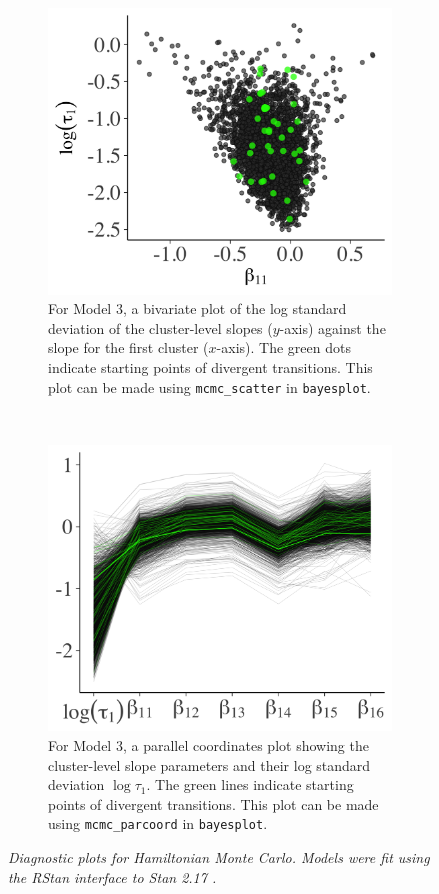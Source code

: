 \documentclass{statsoc}
\newcommand{\bayesplot}{{\tt bayesplot}}
\begin{document}
\begin{figure}
\centering
\begin{subfigure}{0.48\textwidth}
\includegraphics[width=\textwidth]{mcmc_scatter_divs.png}
\caption{For Model 3, a bivariate plot of the log standard deviation of the
cluster-level slopes ($y$-axis) against the slope for the first cluster
($x$-axis). The green dots indicate starting points of divergent transitions.
This plot can be made using {\tt mcmc\_scatter} in \bayesplot. }
\label{fig:mcmc_scatter_divs}
\end{subfigure}
~
\begin{subfigure}{0.48\textwidth}
\includegraphics[width=\textwidth]{mcmc_parcoord_divs.png}
\caption{For Model 3, a parallel coordinates plot showing the cluster-level
slope parameters and their log standard deviation $\log{\tau_1}$. The green
lines indicate starting points of divergent transitions. This plot can be made
using {\tt mcmc\_parcoord} in \bayesplot.}
\label{fig:mcmc_parcoord_divs}
\end{subfigure}

\caption{\it Diagnostic plots for Hamiltonian Monte Carlo.
Models were fit using the RStan interface to Stan 2.17 \citep{rstan}.}
\end{figure}
\end{document}
